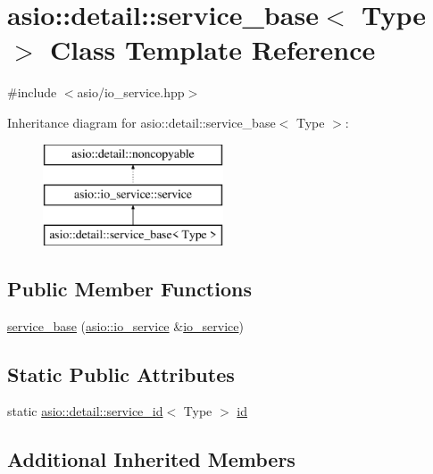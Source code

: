 \hypertarget{classasio_1_1detail_1_1service__base}{}\section{asio\+:\+:detail\+:\+:service\+\_\+base$<$ Type $>$ Class Template Reference}
\label{classasio_1_1detail_1_1service__base}


{\ttfamily \#include $<$asio/io\+\_\+service.\+hpp$>$}

Inheritance diagram for asio\+:\+:detail\+:\+:service\+\_\+base$<$ Type $>$\+:\begin{figure}[H]
\begin{center}
\leavevmode
\includegraphics[height=3.000000cm]{classasio_1_1detail_1_1service__base}
\end{center}
\end{figure}
\subsection*{Public Member Functions}
\begin{DoxyCompactItemize}
\item 
\hyperlink{classasio_1_1detail_1_1service__base_a56364f88e64871081508d5a5571173ee}{service\+\_\+base} (\hyperlink{classasio_1_1io__service}{asio\+::io\+\_\+service} \&\hyperlink{classasio_1_1io__service}{io\+\_\+service})
\end{DoxyCompactItemize}
\subsection*{Static Public Attributes}
\begin{DoxyCompactItemize}
\item 
static \hyperlink{classasio_1_1detail_1_1service__id}{asio\+::detail\+::service\+\_\+id}$<$ Type $>$ \hyperlink{classasio_1_1detail_1_1service__base_a4df341e7693a761a9b83a79ae9b8cd4e}{id}
\end{DoxyCompactItemize}
\subsection*{Additional Inherited Members}


